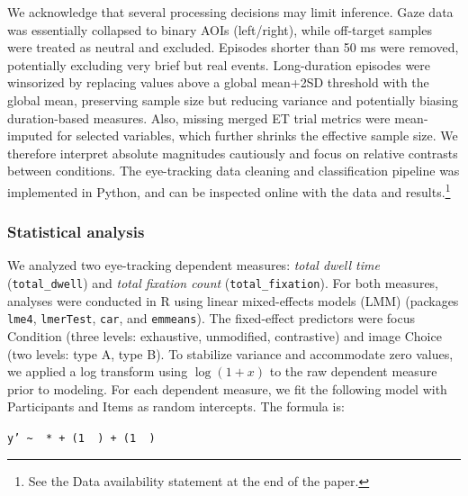 \documentclass[a4paper, ruler]{CUP-JNL-LIN}%
\begin{document}
We acknowledge that several processing decisions may limit inference. Gaze data was essentially collapsed to binary AOIs (left/right), while off-target samples were treated as neutral and excluded. Episodes shorter than 50 ms were removed, potentially excluding very brief but real events. Long-duration episodes were winsorized by replacing values above a global mean+2SD threshold with the global mean, preserving sample size but reducing variance and potentially biasing duration-based measures. Also, missing merged ET trial metrics were mean-imputed for selected variables, which further shrinks the effective sample size. We therefore interpret absolute magnitudes cautiously and focus on relative contrasts between conditions. The eye-tracking data cleaning and classification pipeline was implemented in Python, and can be inspected online with the data and results.\footnote{See the Data availability statement at the end of the paper.}



\subsubsection{Statistical analysis}


We analyzed two eye-tracking dependent measures: \textit{total dwell time} (\texttt{total\_dwell}) and \textit{total fixation count} (\texttt{total\_fixation}). For both measures, analyses were conducted in R using linear mixed-effects models (LMM) (packages \texttt{lme4}, \texttt{lmerTest}, \texttt{car}, and \texttt{emmeans}). The fixed-effect predictors were focus Condition (three levels: exhaustive, unmodified, contrastive) and image Choice (two levels: type A, type B). To stabilize variance and accommodate zero values, we applied a log transform using $\log(1+x)$ to the raw dependent measure prior to modeling. For each dependent measure, we fit the following model with Participants and Items as random intercepts. The formula is: 

\begin{center}
\texttt{y' \sim~ *  + (1 \mid~) + (1 \mid~)}
\end{center}
\end{document}

